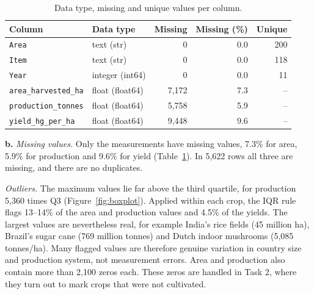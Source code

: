 \documentclass{article}
\begin{document}
\begin{table}[H]
    \centering
    \begin{tabular}{llrrr}
        \toprule
        Column & Data type & Missing & Missing (\%) & Unique \\
        \midrule
        \texttt{Area} & text (str) & 0 & 0.0 & 200 \\
        \texttt{Item} & text (str) & 0 & 0.0 & 118 \\
        \texttt{Year} & integer (int64) & 0 & 0.0 & 11 \\
        \texttt{area\_harvested\_ha} & float (float64) & 7,172 & 7.3 & -- \\
        \texttt{production\_tonnes} & float (float64) & 5,758 & 5.9 & -- \\
        \texttt{yield\_hg\_per\_ha} & float (float64) & 9,448 & 9.6 & -- \\
        \bottomrule
    \end{tabular}
    \caption{Data type, missing and unique values per column.}
    \label{tab:columns}
\end{table}

\begin{table}[H]
    \centering
    \caption{Summary statistics for the numerical columns.}
    \label{tab:summary}
\end{table}

\textbf{b.}
\textit{Missing values.} Only the measurements have missing values, 7.3\% for area, 5.9\% for production and 9.6\% for yield (Table~\ref{tab:columns}). In 5,622 rows all three are missing, and there are no duplicates.

\textit{Outliers.} The maximum values lie far above the third quartile, for production 5,360 times Q3 (Figure~\ref{fig:boxplot}). Applied within each crop, the IQR rule flags 13--14\% of the area and production values and 4.5\% of the yields. The largest values are nevertheless real, for example India's rice fields (45 million ha), Brazil's sugar cane (769 million tonnes) and Dutch indoor mushrooms (5,085 tonnes/ha). Many flagged values are therefore genuine variation in country size and production system, not measurement errors. Area and production also contain more than 2,100 zeros each. These zeros are handled in Task 2, where they turn out to mark crops that were not cultivated.
\end{document}
